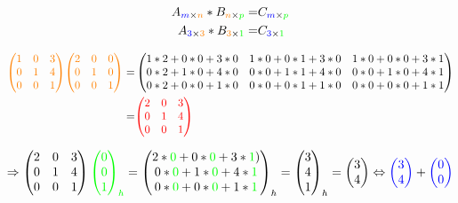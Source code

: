 \documentclass{article}
\begin{document}
\begin{align*}
A_{\textcolor{blue}{m} \times \textcolor{orange}{n}}*B_{\textcolor{orange}{n} \times \textcolor{green}{p}}=&C_{\textcolor{blue}{m} \times \textcolor{green}{p}} \\
A_{\textcolor{blue}{3}\times\textcolor{orange}{3}}*B_{\textcolor{orange}{3}\times\textcolor{green}{1}}=&C_{\textcolor{blue}{3}\times\textcolor{green}{1}}
\end{align*}

\begin{align*}
\textcolor{orange}{\begin{pmatrix}1&0&3\\0&1&4\\0&0&1\end{pmatrix}}\textcolor{orange}{\begin{pmatrix}2&0&0\\0&1&0\\0&0&1\end{pmatrix}}=&\begin{pmatrix}1*2+0*0+3*0&1*0+0*1+3*0&1*0+0*0+3*1\\0*2+1*0+4*0&0*0+1*1+4*0&0*0+1*0+4*1\\0*2+0*0+1*0&0*0+0*1+1*0&0*0+0*0+1*1\end{pmatrix} \\
=&\textcolor{red}{\begin{pmatrix}2&0&3\\0&1&4\\0&0&1\end{pmatrix}}
\end{align*}

\begin{align*}
\Rightarrow\begin{pmatrix}2&0&3\\0&1&4\\0&0&1\end{pmatrix}\textcolor{green}{\begin{pmatrix}0\\0\\1\end{pmatrix}_h}=\begin{pmatrix}2*\textcolor{green}0+0*\textcolor{green}0+3*\textcolor{green}1)\\0*\textcolor{green}0+1*\textcolor{green}0+4*\textcolor{green}1\\0*\textcolor{green}0+0*\textcolor{green}0+1*\textcolor{green}1\end{pmatrix}_h=\begin{pmatrix}3\\4\\1\end{pmatrix}_h=\begin{pmatrix}3\\4\end{pmatrix}\Leftrightarrow\textcolor{blue}{\begin{pmatrix}3\\4\end{pmatrix}}+\textcolor{blue}{\begin{pmatrix}0\\0\end{pmatrix}}
\end{align*}
\end{document}
